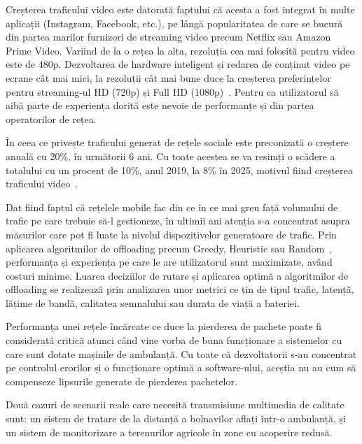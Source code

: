 \documentclass[12pt,a4paper]{report}
\begin{document}
Creșterea traficului video este datorată faptului că acesta a fost integrat în multe aplicații (Instagram, Facebook, etc.), pe lângă popularitatea de care se bucură din partea marilor furnizori de streaming video precum Netflix sau Amazon Prime Video. Variind de la o rețea la alta, rezoluția cea mai folosită pentru video este de 480p. Dezvoltarea de hardware inteligent și redarea de conținut video pe ecrane cât mai mici, la rezoluții cât mai bune duce la creșterea preferințelor pentru streaming-ul HD (720p) și Full HD (1080p)~\cite{ericsson_mobility_report}. Pentru ca utilizatorul să aibă parte de experiența dorită este nevoie de performanțe și din partea operatorilor de rețea.

În ceea ce privește traficului generat de rețele sociale este preconizată o creștere anuală cu 20\%, în următorii 6 ani. Cu toate acestea se va resimți o scădere a totalului cu un procent de 10\%, anul 2019, la 8\% în 2025, motivul fiind creșterea traficului video~\cite{ericsson_mobility_report}.

Dat fiind faptul că rețelele mobile fac din ce în ce mai greu față volumului de trafic pe care trebuie să-l gestioneze, în ultimii ani atenția s-a concentrat asupra măsurilor care pot fi luate la nivelul dispozitivelor generatoare de trafic. Prin aplicarea algoritmilor de offloading precum Greedy, Heuristic sau Random~\cite{offloading-jou}, performanța și experiența pe care le are utilizatorul sunt maximizate, având costuri minime. Luarea deciziilor de rutare și aplicarea optimă a algoritmilor de offloading se realizează prin analizarea unor metrici ce țin de tipul trafic, latență, lățime de bandă, calitatea semnalului sau durata de viață a bateriei.

Performanța unei rețele încărcate ce duce la pierderea de pachete poate fi considerată critică atunci când vine vorba de buna funcționare a sistemelor cu care sunt dotate mașinile de ambulanță. Cu toate că dezvoltatorii s-au concentrat pe controlul erorilor și o funcționare optimă a software-ului, aceștia nu au cum să compenseze lipsurile generate de pierderea pachetelor. 

Două cazuri de scenarii reale care necesită transmisiune multimedia de calitate sunt: un sistem de tratare de la distanță a bolnavilor aflați într-o ambulanță, și un sistem de monitorizare a terenurilor agricole în zone cu acoperire redusă.
\end{document}

